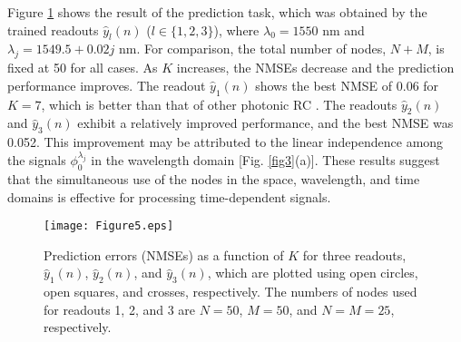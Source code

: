 \documentclass{article}
\begin{document}
Figure \ref{fig5} shows the result of the prediction task, which was
obtained by the trained readouts $\hat{y}_l(n)$ ($l\in \{1,2,3\}$), 
where $\lambda_0 = 1550$ nm and $\lambda_j = 1549.5 + 0.02j$ nm. 
%
For comparison, the total number of nodes, $N+M$, is fixed at 50
for all cases.   
%
As $K$ increases, the NMSEs decrease and the prediction performance improves.   
%
The readout $\hat{y}_1(n)$ shows
the best NMSE of $0.06$ for $K = 7$, which is better than 
that of other photonic RC \cite{Brunner2013,Takano2018}.   
%
The readouts $\hat{y}_2(n)$ and $\hat{y}_3(n)$ exhibit a relatively improved
performance, and the best NMSE was 0.052.
%
This improvement may be attributed to the linear independence
among the signals $\phi^{\lambda_j}_0$ in the wavelength domain
[Fig. \ref{fig3}(a)]. 
%
These results suggest that 
the simultaneous use of the nodes in the space, wavelength, and time domains 
is effective for processing time-dependent signals. 
%
%
\begin{figure}[htbp]
\centering\texttt{[image: Figure5.eps]}
\caption{\label{fig5}
Prediction errors (NMSEs) as a function of $K$ for three readouts,
$\hat{y}_1(n)$, $\hat{y}_2(n)$, and
 $\hat{y}_3(n)$, which 
are plotted using open circles, open squares, and crosses, respectively. 
%
The numbers of nodes used for readouts 1, 2, and 3
are $N = 50$, $M = 50$, and $N = M = 25$, respectively. 
}
\end{figure}
%
\end{document}
